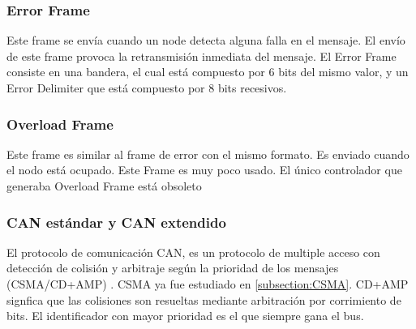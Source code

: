 \subsubsection{Error Frame}
Este frame se envía cuando un node detecta alguna falla en el mensaje. El envío de este frame provoca la retransmisión inmediata del mensaje. El Error Frame consiste en una bandera, el cual está compuesto por 6 bits del mismo valor, y un Error Delimiter que está compuesto por 8 bits recesivos.

\subsubsection{Overload Frame}
Este frame es similar al frame de error con el mismo formato. Es enviado cuando el nodo está ocupado. Este Frame es muy poco usado. El único controlador que generaba Overload Frame está obsoleto \citep{kvaserWEB}

\subsubsection{CAN estándar y CAN extendido}
El protocolo de comunicación CAN, es un protocolo de multiple acceso con detección de colisión y arbitraje según la prioridad de los mensajes (CSMA/CD+AMP) \citep{texasCAN}. CSMA ya fue estudiado en \ref{subsection:CSMA}. CD+AMP signfica que las colisiones son resueltas mediante arbitración por corrimiento de bits. El identificador con mayor prioridad es el que siempre gana el bus.

